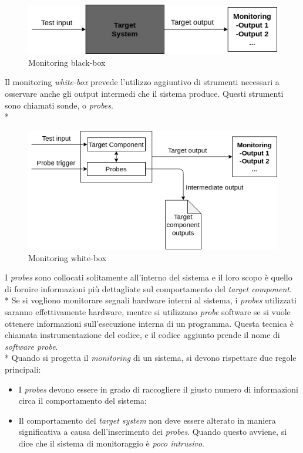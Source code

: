 \begin{figure}[h]
	\centering
	\includegraphics[width=0.7\linewidth]{img/blackbox}
	\caption{Monitoring black-box}
	\label{fig:blackbox}
\end{figure}
\FloatBarrier
Il monitoring \emph{white-box} prevede l'utilizzo aggiuntivo di strumenti necessari a osservare anche gli output intermedi che il sistema produce. Questi strumenti sono chiamati sonde, o \emph{probes}.\\*
\begin{figure}[h]
	\centering
	\includegraphics[width=0.7\linewidth]{img/whitebox}
	\caption{Monitoring white-box}
	\label{fig:whitebox}
\end{figure}
\FloatBarrier
I \emph{probes} sono collocati solitamente all'interno del sistema e il loro scopo \`e quello di fornire informazioni pi\`u dettagliate sul comportamento del \emph{target component}.\\*
Se si vogliono monitorare segnali hardware interni al sistema, i \emph{probes} utilizzati saranno effettivamente hardware, mentre si utilizzano \emph{probe} software se si vuole ottenere informazioni sull'esecuzione interna di un programma. Questa tecnica \`e chiamata instrumentazione del codice, e il codice aggiunto prende il nome di \emph{software probe}.\\*
Quando si progetta il \emph{monitoring} di un sistema, si devono rispettare due regole principali:
\begin{itemize}
	\item I \emph{probes} devono essere in grado di raccogliere il giusto numero di informazioni circa il comportamento del sistema;
	\item Il comportamento del \emph{target system} non deve essere alterato in maniera significativa a causa dell'inserimento dei \emph{probes}. Quando questo avviene, si dice che il sistema di monitoraggio \`e \emph{poco intrusivo}.
\end{itemize}
